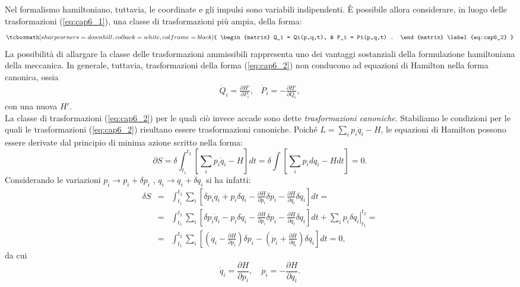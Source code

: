 Nel formalismo hamiltoniano, tuttavia, le coordinate e gli impulsi sono variabili indipendenti. \`E possibile allora considerare, in luogo delle trasformazioni (\ref{eq:cap6_1}), una classe di trasformazioni pi\`u ampia, della forma:
	\begin{equation}
		\tcboxmath[sharp corners=downhill, colback=white, colframe=black]{
			\begin{matrix}
			Q_i = Qi(p,q,t),  & P_i = Pi(p,q,t) .
			\end{matrix}
			\label{eq:cap6_2}
			}
	\end{equation}
La possibilit\`a di allargare la classe delle trasformazioni ammissibili rappresenta uno dei vantaggi sostanziali della formulazione hamiltoniana della meccanica.
In generale, tuttavia, trasformazioni della forma (\ref{eq:cap6_2}) non conducono ad equazioni di Hamilton nella forma canonica, ossia
	\begin{equation}
		\begin{matrix}
		\displaystyle{\dot{Q}_i = \frac{\partial H'}{\partial P_i}}, & \displaystyle{\dot{P}_i = -\frac{\partial H'}{\partial Q_i}}  ,
		\end{matrix}
	\end{equation}
con una nuova $H'$.\\

La classe di trasformazioni (\ref{eq:cap6_2}) per le quali ci\`o invece accade sono dette \textit{trasformazioni canoniche}. Stabiliamo le condizioni per le quali le trasformazioni (\ref{eq:cap6_2}) risultano essere trasformazioni canoniche.
Poiché $ L = \sum _i p_i \dot{q}_i -H $, le equazioni di Hamilton possono essere derivate dal principio di minima azione scritto nella forma:
	\begin{equation}
		\partial S = \delta \int_{t_1}^{t_2} \left[ \sum_i p_i \dot{q}_i - H \right] dt = \delta \int \left[ \sum_i p_i dq_i - Hdt \right] = 0 .
		\label{eq:cap6_3}
	\end{equation}
Considerando le variazioni $p_i \rightarrow p_i + \delta p_i$ , $q_i \rightarrow q_i + \delta q_i$ si ha infatti:
	\begin{eqnarray}
		\delta S & =& \int _{t_1} ^{t_2} \sum _i \left[ \delta p_i \dot{q}_i + p_i \delta \dot{q}_i - \frac{\partial H}{\partial p_i} \delta p_i - \frac{\partial H}{\partial q_i}\delta q_i \right] dt = \nonumber \\
		&=&\int _{t_1} ^{t_2} \sum _i \left[ \delta p_i \dot{q}_i - p_i \delta \dot{q}_i - \frac{\partial H}{\partial p_i} \delta p_i - \frac{\partial H }{\partial q_i} \delta q_i \right] dt + \left.\sum_i  p_i \delta q_i \right\vert _{t_1} ^{t_2} = \nonumber \\
		&=& \int _{t_1} ^{t_2} \sum _i \left[ \left( \dot{q}_i - \frac{\partial H}{\partial p_i} \right) \delta p_i - \left( \dot{p}_i + \frac{\partial H}{\partial q_i}\right)\delta q_i \right] dt = 0 ,
	\end{eqnarray}
da cui
	\begin{equation}
		\dot{q}_i = \frac{\partial H}{\partial p_i} , \quad \dot{p}_i = - \frac{\partial H}{\partial q_i} .
	\end{equation}\\
	
